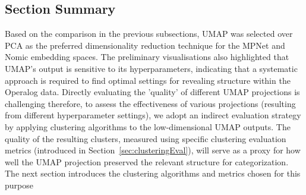 \documentclass[10pt,oneside]{report}
\begin{document}
\subsection{Section Summary}

Based on the comparison in the previous subsections, UMAP was selected over PCA as the preferred dimensionality reduction technique for the MPNet and Nomic embedding spaces. The preliminary visualisations also highlighted that UMAP's output is sensitive to its hyperparameters, indicating that a systematic approach is required to find optimal settings for revealing structure within the Operalog data. Directly evaluating the 'quality' of different UMAP projections is challenging therefore, to assess the effectiveness of various projections (resulting from different hyperparameter settings), we adopt an indirect evaluation strategy by applying clustering algorithms to the low-dimensional UMAP outputs. The quality of the resulting clusters, measured using specific clustering evaluation metrics (introduced in Section~\ref{sec:clusteringEval}), will serve as a proxy for how well the UMAP projection preserved the relevant structure for categorization. The next section introduces the clustering algorithms and metrics chosen for this purpose

\end{document}
